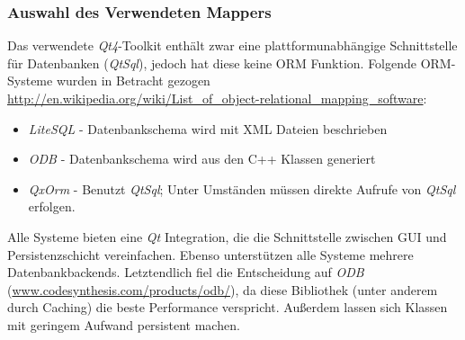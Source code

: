 \subsubsection{Auswahl des Verwendeten Mappers}
Das verwendete \textit{Qt4}-Toolkit enthält zwar eine plattformunabhängige Schnittstelle für Datenbanken (\textit{QtSql}), jedoch hat diese keine ORM Funktion.
Folgende ORM-Systeme wurden in Betracht gezogen\\
\url{http://en.wikipedia.org/wiki/List_of_object-relational_mapping_software}:
\begin{itemize}
	\item \textit{LiteSQL} - Datenbankschema wird mit XML Dateien beschrieben
	\item \textit{ODB} - Datenbankschema wird aus den C++ Klassen generiert
	\item \textit{QxOrm} - Benutzt \textit{QtSql}; Unter Umständen müssen direkte Aufrufe von \textit{QtSql} erfolgen. \cite{QxOrm_Tutorial}
\end{itemize}
Alle Systeme bieten eine \textit{Qt} Integration, die die Schnittstelle zwischen GUI und Persistenzschicht vereinfachen.
Ebenso unterstützen alle Systeme mehrere Datenbankbackends.
Letztendlich fiel die Entscheidung auf \textit{ODB}
(\href{http://www.codesynthesis.com/products/odb/}{www.codesynthesis.com/products/odb/}), da diese Bibliothek (unter anderem durch
Caching) die beste Performance verspricht.
Außerdem lassen sich Klassen mit geringem Aufwand persistent machen.

\newpage

